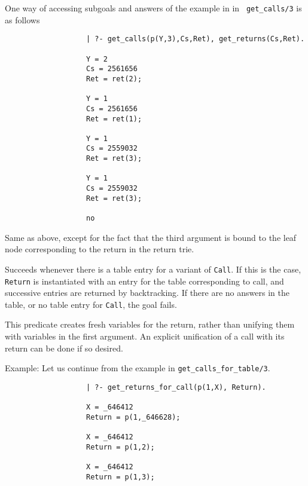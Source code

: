 \begin{description}
One way of accessing subgoals and answers of the example in in {\tt
get\_calls/3} is as follows 
%
{\footnotesize 
\begin{verbatim} 
                   | ?- get_calls(p(Y,3),Cs,Ret), get_returns(Cs,Ret).

                   Y = 2
                   Cs = 2561656
                   Ret = ret(2);

                   Y = 1
                   Cs = 2561656
                   Ret = ret(1);

                   Y = 1
                   Cs = 2559032
                   Ret = ret(3);

                   Y = 1
                   Cs = 2559032
                   Ret = ret(3);

                   no

     \end{verbatim}
     }


Same as above, except for the fact that the third argument is bound
to the leaf node corresponding to the return in the return trie.


Succeeds whenever there is a table entry for a variant of {\tt Call}.
If this is the case, {\tt Return} is instantiated with an entry for
the table corresponding to call, and successive entries are returned
by backtracking.  If there are no answers in the table, or no table
entry for {\tt Call}, the goal fails.

This predicate creates fresh variables for the return, rather than
unifying them with variables in the first argument.  An explicit
unification of a call with its return can be done if so desired.

Example:
Let us continue from the example in {\tt get\_calls\_for\_table/3}.

    {\footnotesize
     \begin{verbatim}
                   | ?- get_returns_for_call(p(1,X), Return).

                   X = _646412
                   Return = p(1,_646628);

                   X = _646412
                   Return = p(1,2);

                   X = _646412
                   Return = p(1,3);


\end{verbatim}}
\end{description}
